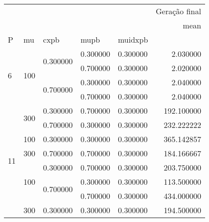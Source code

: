 \begin{tabular}{lllllr}
\toprule
 &  &  &  &  & Geração final \\
 &  &  &  &  & mean \\
P & mu & cxpb & mupb & muidxpb &  \\
\midrule
\multirow[t]{4}{*}{6} & \multirow[t]{4}{*}{100} & \multirow[t]{2}{*}{0.300000} & 0.300000 & 0.300000 & 2.030000 \\
\cline{4-6}
 &  &  & 0.700000 & 0.300000 & 2.020000 \\
\cline{3-6} \cline{4-6}
 &  & \multirow[t]{2}{*}{0.700000} & 0.300000 & 0.300000 & 2.040000 \\
\cline{4-6}
 &  &  & 0.700000 & 0.300000 & 2.040000 \\
\cline{1-6} \cline{2-6} \cline{3-6} \cline{4-6}
\multirow[t]{8}{*}{11} & \multirow[t]{2}{*}{300} & 0.300000 & 0.700000 & 0.300000 & 192.100000 \\
\cline{3-6} \cline{4-6}
 &  & 0.700000 & 0.300000 & 0.300000 & 232.222222 \\
\cline{2-6} \cline{3-6} \cline{4-6}
 & 100 & 0.300000 & 0.300000 & 0.300000 & 365.142857 \\
\cline{2-6} \cline{3-6} \cline{4-6}
 & 300 & 0.700000 & 0.700000 & 0.300000 & 184.166667 \\
\cline{2-6} \cline{3-6} \cline{4-6}
 & \multirow[t]{3}{*}{100} & 0.300000 & 0.700000 & 0.300000 & 203.750000 \\
\cline{3-6} \cline{4-6}
 &  & \multirow[t]{2}{*}{0.700000} & 0.300000 & 0.300000 & 113.500000 \\
\cline{4-6}
 &  &  & 0.700000 & 0.300000 & 434.000000 \\
\cline{2-6} \cline{3-6} \cline{4-6}
 & 300 & 0.300000 & 0.300000 & 0.300000 & 194.500000 \\
\cline{1-6} \cline{2-6} \cline{3-6} \cline{4-6}
\bottomrule
\end{tabular}
